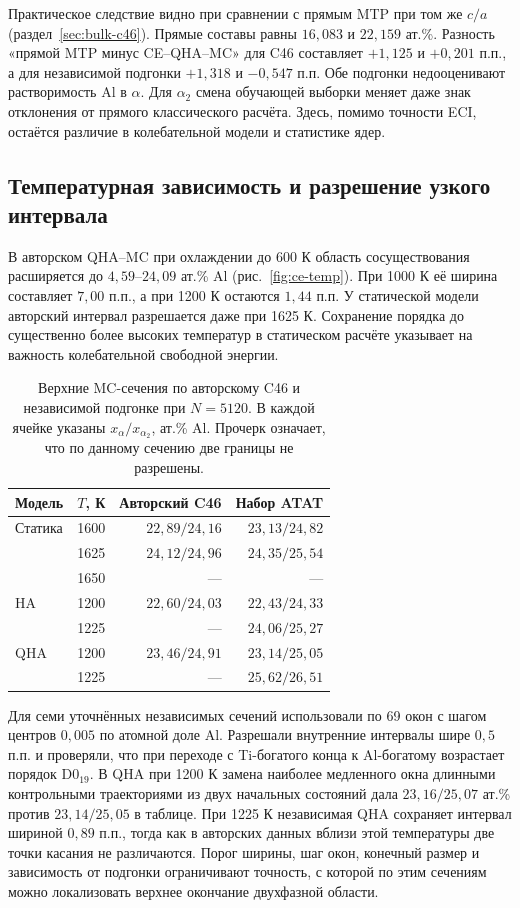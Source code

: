 Практическое следствие видно при сравнении с прямым MTP при том же
\(c/a\) (раздел~\ref{sec:bulk-c46}). Прямые составы равны
\(16{,}083\) и \(22{,}159\) ат.\%. Разность «прямой MTP минус
CE--QHA--MC» для C46 составляет \(+1{,}125\) и \(+0{,}201\) п.п.,
а для независимой подгонки \(+1{,}318\) и \(-0{,}547\) п.п.
Обе подгонки недооценивают растворимость Al в \(\alpha\). Для
\(\alpha_2\) смена обучающей выборки меняет даже знак отклонения
от прямого классического расчёта. Здесь, помимо точности ECI, остаётся
различие в колебательной модели и статистике ядер.

\subsection{Температурная зависимость и разрешение узкого интервала}
В авторском QHA--MC при охлаждении до 600 К область сосуществования
расширяется до \(4{,}59\)--\(24{,}09\) ат.\% Al (рис.~\ref{fig:ce-temp}).
При 1000 К её ширина составляет \(7{,}00\) п.п., а при 1200 К
остаются \(1{,}44\) п.п.
У статической модели авторский интервал разрешается даже при 1625 К.
Сохранение порядка до существенно более высоких температур в статическом
расчёте указывает на важность колебательной свободной энергии.

\begin{table}[htbp]
\centering\small
\caption{Верхние MC-сечения по авторскому C46 и независимой подгонке
при \(N=5120\). В каждой ячейке указаны \(x_\alpha/x_{\alpha_2}\),
ат.\% Al. Прочерк означает, что по данному сечению две границы не разрешены.}
\label{tab:ce-upper}
\begin{tabular}{@{}lrrr@{}}
\toprule
Модель & \(T\), К & Авторский C46 & Набор ATAT\\
\midrule
Статика & 1600 & \(22{,}89/24{,}16\) & \(23{,}13/24{,}82\)\\
        & 1625 & \(24{,}12/24{,}96\) & \(24{,}35/25{,}54\)\\
        & 1650 & --- & ---\\
HA      & 1200 & \(22{,}60/24{,}03\) & \(22{,}43/24{,}33\)\\
        & 1225 & --- & \(24{,}06/25{,}27\)\\
QHA     & 1200 & \(23{,}46/24{,}91\) & \(23{,}14/25{,}05\)\\
        & 1225 & --- & \(25{,}62/26{,}51\)\\
\bottomrule
\end{tabular}
\end{table}

Для семи уточнённых независимых сечений использовали по 69 окон с
шагом центров \(0{,}005\) по атомной доле Al. Разрешали внутренние
интервалы шире \(0{,}5\) п.п. и проверяли, что при переходе с
Ti-богатого конца к Al-богатому возрастает порядок D0$_{19}$.
В QHA при 1200 К замена наиболее медленного окна длинными
контрольными траекториями из двух начальных состояний дала
\(23{,}16/25{,}07\) ат.\% против \(23{,}14/25{,}05\) в таблице.
При 1225 К независимая QHA сохраняет интервал шириной \(0{,}89\) п.п.,
тогда как в авторских данных вблизи этой температуры две точки касания
не различаются. Порог ширины, шаг окон, конечный размер и зависимость
от подгонки ограничивают точность, с которой по этим сечениям можно
локализовать верхнее окончание двухфазной области.
